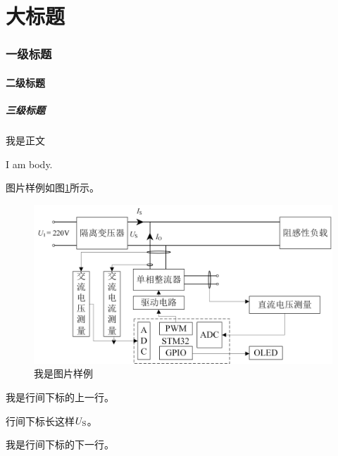 \documentclass[12pt]{ctexart}
\begin{document}
\songti{}

\pagestyle{plain}

\thispagestyle{empty}
\part*{大标题}


\newpage

\setcounter{page}{2}

\section{一级标题}
\subsection{二级标题}
\subsubsection{三级标题}

我是正文

I am body.

图片样例如图\ref{img_template}所示。

\begin{figure}[htbp!]
  \centering
  \includegraphics{img/template.png}
  \caption{我是图片样例}
  \label{img_template}
\end{figure}

我是行间下标的上一行。

行间下标长这样$U_{\rm S}$。

我是行间下标的下一行。
\end{document}
